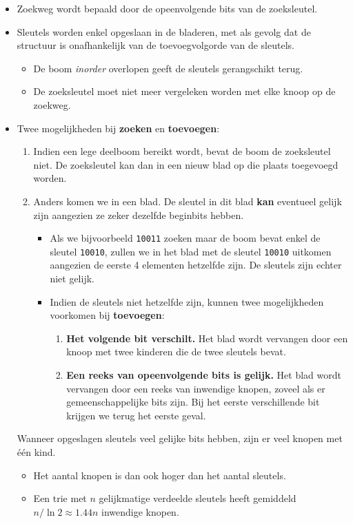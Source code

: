 \begin{itemize}
    \item Zoekweg wordt bepaald door de opeenvolgende bits van de zoeksleutel.
    \item Sleutels worden enkel opgeslaan in de bladeren, met als gevolg dat de structuur is onafhankelijk van de toevoegvolgorde van de sleutels.
    \begin{itemize}
        \item  De boom \textit{inorder} overlopen geeft de sleutels gerangschikt terug.
        \item  De zoeksleutel moet niet meer vergeleken worden met elke knoop op de zoekweg. 
    \end{itemize}
    \item Twee mogelijkheden bij \textbf{zoeken} en \textbf{toevoegen}:
    \begin{enumerate}
        \item Indien een lege deelboom bereikt wordt, bevat de boom de zoeksleutel niet. De zoeksleutel kan dan in een nieuw blad op die plaats toegevoegd worden.
        \item Anders komen we in een blad. De sleutel in dit blad \textbf{kan} eventueel gelijk zijn aangezien ze zeker dezelfde beginbits hebben.  

        \begin{itemize}
            \item Als we bijvoorbeeld \texttt{10011} zoeken maar de boom bevat enkel de sleutel \texttt{10010}, zullen we in het blad met de sleutel \texttt{10010} uitkomen aangezien de eerste 4 elementen hetzelfde zijn. De sleutels zijn echter niet gelijk.
            \item Indien de sleutels niet hetzelfde zijn, kunnen twee mogelijkheden voorkomen bij \textbf{toevoegen}:
            \begin{enumerate}
                \item \textbf{Het volgende bit verschilt.} Het blad wordt vervangen door een knoop met twee kinderen die de twee sleutels bevat.
                \item \textbf{Een reeks van opeenvolgende bits is gelijk.} Het blad wordt vervangen door een reeks van inwendige knopen, zoveel als er gemeenschappelijke bits zijn. Bij het eerste verschillende bit krijgen we terug het eerste geval.
            \end{enumerate}
        \end{itemize}
    \end{enumerate}
    \alert Wanneer opgeslagen sleutels veel gelijke bits hebben, zijn er veel knopen met één kind.
    \begin{itemize}
        \item Het aantal knopen is dan ook hoger dan het aantal sleutels.
        \item Een trie met $n$ gelijkmatige verdeelde sleutels heeft gemiddeld $n/\ln 2 \approx 1.44n$ inwendige knopen.
    \end{itemize}

\end{itemize}


